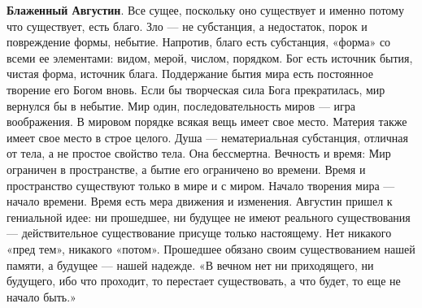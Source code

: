 \documentclass[12pt]{article}
\begin{document}
\textbf{Блаженный Августин}. Все сущее, поскольку оно существует и именно потому что существует,
есть благо. Зло ---
не субстанция, а недостаток, порок и повреждение формы, небытие. Напротив, благо есть субстанция, «форма»
со всеми ее элементами: видом, мерой, числом, порядком. Бог есть источник бытия, чистая форма, источник
блага. Поддержание бытия мира есть постоянное творение его Богом вновь. Если бы творческая сила Бога
прекратилась, мир вернулся бы в небытие. Мир один, последовательность миров --- игра воображения.
В мировом порядке
всякая вещь имеет свое место. Материя также имеет свое место в строе целого.
Душа --- нематериальная субстанция, отличная от тела, а не простое свойство тела. Она бессмертна.
Вечность и время: Мир ограничен в пространстве, а бытие его ограничено во времени. Время и пространство
существуют только в мире и с миром. Начало творения мира --- начало времени. Время есть мера движения и
изменения. Августин пришел к гениальной идее: ни прошедшее, ни будущее не имеют реального существования
---
действительное  существование  присуще  только  настоящему.  Нет  никакого  «пред  тем»,  никакого  «потом».
Прошедшее обязано своим существованием нашей памяти, а будущее --- нашей надежде. «В вечном нет ни
приходящего, ни будущего, ибо что проходит, то перестает существовать, а что будет, то еще не начало быть.»
\end{document}
